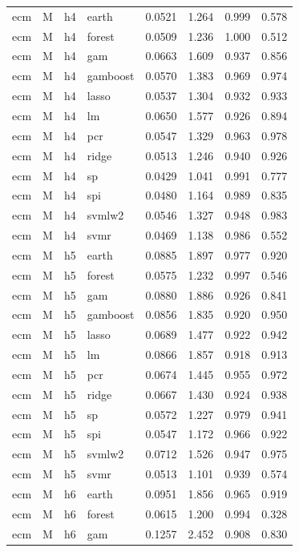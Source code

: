 \begin{ThreePartTable}
\begin{longtable}[t]{llclcccc}
\addlinespace
ecm & M & h4 & earth & 0.0521 & 1.264 & 0.999 & 0.578\\
ecm & M & h4 & forest & 0.0509 & 1.236 & 1.000 & 0.512\\
ecm & M & h4 & gam & 0.0663 & 1.609 & 0.937 & 0.856\\
ecm & M & h4 & gamboost & 0.0570 & 1.383 & 0.969 & 0.974\\
ecm & M & h4 & lasso & 0.0537 & 1.304 & 0.932 & 0.933\\
ecm & M & h4 & lm & 0.0650 & 1.577 & 0.926 & 0.894\\
ecm & M & h4 & pcr & 0.0547 & 1.329 & 0.963 & 0.978\\
ecm & M & h4 & ridge & 0.0513 & 1.246 & 0.940 & 0.926\\
ecm & M & h4 & sp & 0.0429 & 1.041 & 0.991 & 0.777\\
ecm & M & h4 & spi & 0.0480 & 1.164 & 0.989 & 0.835\\
ecm & M & h4 & svmlw2 & 0.0546 & 1.327 & 0.948 & 0.983\\
ecm & M & h4 & svmr & 0.0469 & 1.138 & 0.986 & 0.552\\
\addlinespace
ecm & M & h5 & earth & 0.0885 & 1.897 & 0.977 & 0.920\\
ecm & M & h5 & forest & 0.0575 & 1.232 & 0.997 & 0.546\\
ecm & M & h5 & gam & 0.0880 & 1.886 & 0.926 & 0.841\\
ecm & M & h5 & gamboost & 0.0856 & 1.835 & 0.920 & 0.950\\
ecm & M & h5 & lasso & 0.0689 & 1.477 & 0.922 & 0.942\\
ecm & M & h5 & lm & 0.0866 & 1.857 & 0.918 & 0.913\\
ecm & M & h5 & pcr & 0.0674 & 1.445 & 0.955 & 0.972\\
ecm & M & h5 & ridge & 0.0667 & 1.430 & 0.924 & 0.938\\
ecm & M & h5 & sp & 0.0572 & 1.227 & 0.979 & 0.941\\
ecm & M & h5 & spi & 0.0547 & 1.172 & 0.966 & 0.922\\
ecm & M & h5 & svmlw2 & 0.0712 & 1.526 & 0.947 & 0.975\\
ecm & M & h5 & svmr & 0.0513 & 1.101 & 0.939 & 0.574\\
\addlinespace
ecm & M & h6 & earth & 0.0951 & 1.856 & 0.965 & 0.919\\
ecm & M & h6 & forest & 0.0615 & 1.200 & 0.994 & 0.328\\
ecm & M & h6 & gam & 0.1257 & 2.452 & 0.908 & 0.830\\

\end{longtable}
\end{ThreePartTable}
